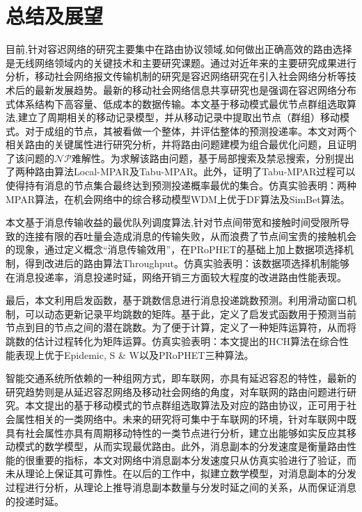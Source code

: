 
\chapter{总结及展望}

目前,针对容迟网络的研究主要集中在路由协议领域,如何做出正确高效的路由选择是无线网络领域内的关键技术和主要研究课题。通过对近年来的主要研究成果进行分析，移动社会网络报文传输机制的研究是容迟网络研究在引入社会网络分析等技术后的最新发展趋势。最新的移动社会网络信息共享研究也是强调在容迟网络分布式体系结构下高容量、低成本的数据传输。本文基于移动模式最优节点群组选取算法,建立了周期相关的移动记录模型，并从移动记录中提取出节点（群组）移动模式。对于成组的节点，其被看做一个整体，并评估整体的预测投递率。本文对两个相关路由的关键属性进行研究分析，并将路由问题建模为组合最优化问题，且证明了该问题的$\mathcal{NP}$难解性。为求解该路由问题，基于局部搜索及禁忌搜索，分别提出了两种路由算法Local-MPAR及Tabu-MPAR。此外，证明了Tabu-MPAR过程可以使得持有消息的节点集合最终达到预测投递概率最优的集合。仿真实验表明：两种MPAR算法，在机会网络中的综合移动模型WDM上优于DF算法及SimBet算法。

本文基于消息传输收益的最优队列调度算法,针对节点间带宽和接触时间受限所导致的连接有限的吞吐量会造成消息的传输失败，从而浪费了节点间宝贵的接触机会的现象，通过定义概念“消息传输效用”，在PRoPHET的基础上加上数据项选择机制，得到改进后的路由算法Throughput。仿真实验表明：该数据项选择机制能够在消息投递率，消息投递时延，网络开销三方面较大程度的改进路由性能表现。

最后，本文利用启发函数，基于跳数信息进行消息投递跳数预测。利用滑动窗口机制，可以动态更新记录平均跳数的矩阵。基于此，定义了启发式函数用于预测当前节点到目的节点之间的潜在跳数。为了便于计算，定义了一种矩阵运算符，从而将跳数的估计过程转化为矩阵运算。仿真实验表明：本文提出的HCH算法在综合性能表现上优于Epidemic, S \& W以及PRoPHET三种算法。

智能交通系统所依赖的一种组网方式，即车联网，亦具有延迟容忍的特性，最新的研究趋势则是从延迟容忍网络及移动社会网络的角度，对车联网的路由问题进行研究。本文提出的基于移动模式的节点群组选取算法及对应的路由协议，正可用于社会属性相关的一类网络中。未来的研究将可集中于车联网的环境，针对车联网中既具有社会属性亦具有周期移动特性的一类节点进行分析，建立出能够如实反应其移动模式的数学模型，从而实现最优路由。此外，消息副本的分发速度是衡量路由性能的很重要的指标，本文对网络中消息副本分发速度只从仿真实验进行了验证，而未从理论上保证其可靠性。在以后的工作中，拟建立数学模型，对消息副本的分发过程进行分析，从理论上推导消息副本数量与分发时延之间的关系，从而保证消息的投递时延。

